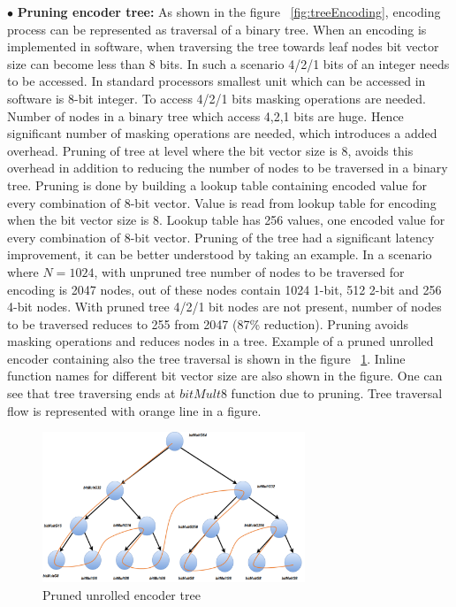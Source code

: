 $\bullet$ \textbf{Pruning encoder tree:} As shown in the figure ~\ref{fig:treeEncoding}, encoding process can be represented as traversal of a binary tree. When an encoding is implemented in software, when traversing the tree towards leaf nodes bit vector size can become less than 8 bits. In such a scenario 4/2/1 bits of an integer needs to be accessed. In standard processors smallest unit which can be accessed in software is 8-bit integer. To access 4/2/1 bits masking operations are needed. Number of nodes in a binary tree which access 4,2,1 bits are huge. Hence significant number of masking operations are needed, which introduces a added overhead. Pruning of tree at level where the bit vector size is 8, avoids this overhead in addition to reducing the number of nodes to be traversed in a binary tree. Pruning is done by building a lookup table containing encoded value for every combination of 8-bit vector. Value is read from lookup table for encoding when the bit vector size is 8. Lookup table has 256 values, one encoded value for every combination of 8-bit vector.\newline
\newline
Pruning of the tree had a significant latency improvement, it can be better understood by taking an example. In a scenario where $N = 1024$, with unpruned tree number of nodes to be traversed for encoding is 2047 nodes, out of these nodes contain 1024 1-bit, 512 2-bit and 256 4-bit nodes. With pruned tree 4/2/1 bit nodes are not present, number of nodes to be traversed reduces to 255 from 2047 (87\% reduction). Pruning avoids masking operations and reduces nodes in a tree. \newline
\newline
Example of a pruned unrolled encoder containing also the tree traversal is shown in the figure ~\ref{fig:unrolledEncoder}. Inline function names for different bit vector size are also shown in the figure. One can see that tree traversing ends at $bitMult8$ function due to pruning. Tree traversal flow is represented with orange line in a figure.

\begin{figure}[!h]
	\centering
	\includegraphics[width=0.7\textwidth]{./figures/unrolledEncoder.pdf}
	\caption{Pruned unrolled encoder tree}
	\label{fig:unrolledEncoder}
\end{figure}

